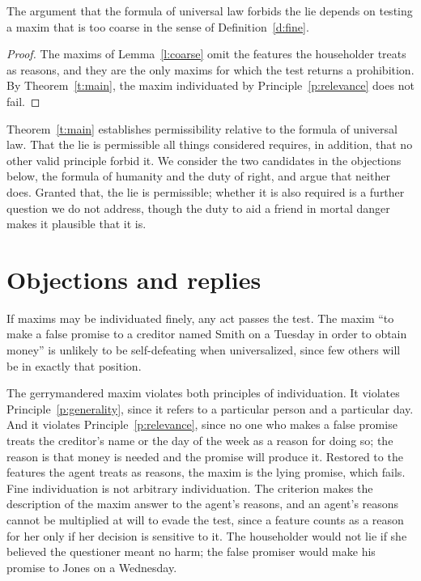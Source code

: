 \documentclass{situationist-preprint}
\begin{document}
\begin{corollary}\label{c:diagnosis}
The argument that the formula of universal law forbids the lie depends on testing a maxim that is too coarse in the sense of Definition~\ref{d:fine}.
\end{corollary}

\begin{proof}
The maxims of Lemma~\ref{l:coarse} omit the features the householder treats as reasons, and they are the only maxims for which the test returns a prohibition. By Theorem~\ref{t:main}, the maxim individuated by Principle~\ref{p:relevance} does not fail.
\end{proof}

Theorem~\ref{t:main} establishes permissibility relative to the formula of universal law. That the lie is permissible all things considered requires, in addition, that no other valid principle forbid it. We consider the two candidates in the objections below, the formula of humanity and the duty of right, and argue that neither does. Granted that, the lie is permissible; whether it is also required is a further question we do not address, though the duty to aid a friend in mortal danger makes it plausible that it is.

\section{Objections and replies}

\begin{objection}[Gerrymandering]\label{o:gerry}
If maxims may be individuated finely, any act passes the test. The maxim \enquote{to make a false promise to a creditor named Smith on a Tuesday in order to obtain money} is unlikely to be self-defeating when universalized, since few others will be in exactly that position.
\end{objection}

\begin{reply}
The gerrymandered maxim violates both principles of individuation. It violates Principle~\ref{p:generality}, since it refers to a particular person and a particular day. And it violates Principle~\ref{p:relevance}, since no one who makes a false promise treats the creditor's name or the day of the week as a reason for doing so; the reason is that money is needed and the promise will produce it. Restored to the features the agent treats as reasons, the maxim is the lying promise, which fails. Fine individuation is not arbitrary individuation. The criterion makes the description of the maxim answer to the agent's reasons, and an agent's reasons cannot be multiplied at will to evade the test, since a feature counts as a reason for her only if her decision is sensitive to it. The householder would not lie if she believed the questioner meant no harm; the false promiser would make his promise to Jones on a Wednesday.
\end{reply}
\end{document}
